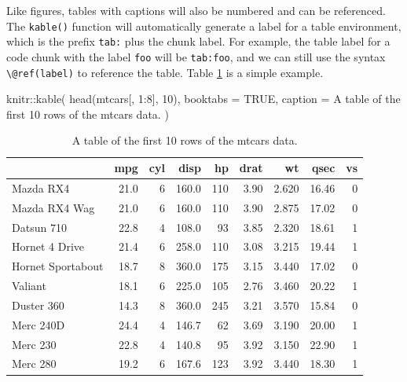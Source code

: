 \documentclass[
  12pt,
]{krantz}
\newenvironment{Shaded}{\begin{snugshade}}{\end{snugshade}}
\newcommand{\AttributeTok}[1]{\textcolor[rgb]{0.77,0.63,0.00}{#1}}
\newcommand{\ConstantTok}[1]{\textcolor[rgb]{0.00,0.00,0.00}{#1}}
\newcommand{\DecValTok}[1]{\textcolor[rgb]{0.00,0.00,0.81}{#1}}
\newcommand{\FunctionTok}[1]{\textcolor[rgb]{0.00,0.00,0.00}{#1}}
\newcommand{\NormalTok}[1]{#1}
\newcommand{\SpecialCharTok}[1]{\textcolor[rgb]{0.00,0.00,0.00}{#1}}
\newcommand{\StringTok}[1]{\textcolor[rgb]{0.31,0.60,0.02}{#1}}
\theoremstyle{definition}
\theoremstyle{definition}
\theoremstyle{definition}
\theoremstyle{definition}
\theoremstyle{remark}
\begin{document}
Like figures, tables with captions will also be numbered and can be referenced. The \texttt{kable()} function will automatically generate a label for a table environment, which is the prefix \texttt{tab:} plus the chunk label. For example, the table label for a code chunk with the label \texttt{foo} will be \texttt{tab:foo}, and we can still use the syntax \texttt{\textbackslash{}@ref(label)} to reference the table. Table \ref{tab:table-single} is a simple example.

\begin{Shaded}
\begin{Highlighting}[]
\NormalTok{knitr}\SpecialCharTok{::}\FunctionTok{kable}\NormalTok{(}
  \FunctionTok{head}\NormalTok{(mtcars[, }\DecValTok{1}\SpecialCharTok{:}\DecValTok{8}\NormalTok{], }\DecValTok{10}\NormalTok{), }\AttributeTok{booktabs =} \ConstantTok{TRUE}\NormalTok{,}
  \AttributeTok{caption =} \StringTok{\textquotesingle{}A table of the first 10 rows of the mtcars data.\textquotesingle{}}
\NormalTok{)}
\end{Highlighting}
\end{Shaded}

\begin{table}

\caption{\label{tab:table-single}A table of the first 10 rows of the mtcars data.}
\centering
\begin{tabular}[t]{lrrrrrrrr}
\toprule
  & mpg & cyl & disp & hp & drat & wt & qsec & vs\\
\midrule
Mazda RX4 & 21.0 & 6 & 160.0 & 110 & 3.90 & 2.620 & 16.46 & 0\\
Mazda RX4 Wag & 21.0 & 6 & 160.0 & 110 & 3.90 & 2.875 & 17.02 & 0\\
Datsun 710 & 22.8 & 4 & 108.0 & 93 & 3.85 & 2.320 & 18.61 & 1\\
Hornet 4 Drive & 21.4 & 6 & 258.0 & 110 & 3.08 & 3.215 & 19.44 & 1\\
Hornet Sportabout & 18.7 & 8 & 360.0 & 175 & 3.15 & 3.440 & 17.02 & 0\\
\addlinespace
Valiant & 18.1 & 6 & 225.0 & 105 & 2.76 & 3.460 & 20.22 & 1\\
Duster 360 & 14.3 & 8 & 360.0 & 245 & 3.21 & 3.570 & 15.84 & 0\\
Merc 240D & 24.4 & 4 & 146.7 & 62 & 3.69 & 3.190 & 20.00 & 1\\
Merc 230 & 22.8 & 4 & 140.8 & 95 & 3.92 & 3.150 & 22.90 & 1\\
Merc 280 & 19.2 & 6 & 167.6 & 123 & 3.92 & 3.440 & 18.30 & 1\\
\bottomrule
\end{tabular}
\end{table}
\end{document}
